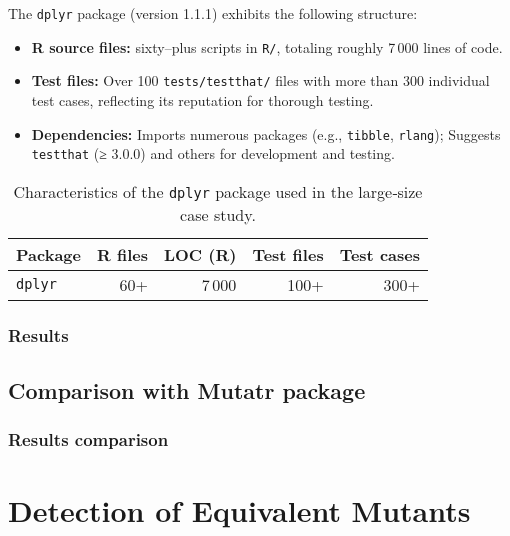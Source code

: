 The \texttt{dplyr} package (version 1.1.1) exhibits the following structure:

\begin{itemize}
  \item \textbf{R source files:}  sixty–plus scripts in \texttt{R/}, totaling roughly 7\,000 lines of code.
  \item \textbf{Test files:} Over 100 \texttt{tests/testthat/} files with more than 300 individual test cases, reflecting its reputation for thorough testing.
  \item \textbf{Dependencies:} Imports numerous packages (e.g., \texttt{tibble}, \texttt{rlang}); Suggests \texttt{testthat} (≥ 3.0.0) and others for development and testing.
\end{itemize}

\begin{table}[htbp]
  \centering
  \begin{tabular}{lrrrr}
    \hline\hline
    Package & R files & LOC (R) & Test files & Test cases \\
    \hline
    \texttt{dplyr} & 60+ & 7\,000 & 100+ & 300+ \\
  \end{tabular}
  \caption{Characteristics of the \texttt{dplyr} package used in the large‐size case study.}
  \label{tab:dplyr-metrics}
\end{table}

\subsubsection{Results}

\subsection{Comparison with Mutatr package}

 
\subsubsection{Results comparison}


\section{Detection of Equivalent Mutants}

